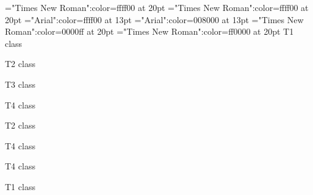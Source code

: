 \font\tdta="Times New Roman":color=ffff00 at 20pt
\font\tdtbta="Times New Roman":color=ffff00 at 20pt
\font\tdtctbta="Arial":color=ffff00 at 13pt
\font\tctbta="Arial":color=008000 at 13pt
\font\tbta="Times New Roman":color=0000ff at 20pt
\font\ta="Times New Roman":color=ff0000 at 20pt
\ta T1 class 

\tbta T2 class 

\tctbta T3 class 

\tdtctbta T4 class 

\tbta T2 class 

\tdtbta T4 class 

\tdta T4 class 

\ta T1 class 


\bye
